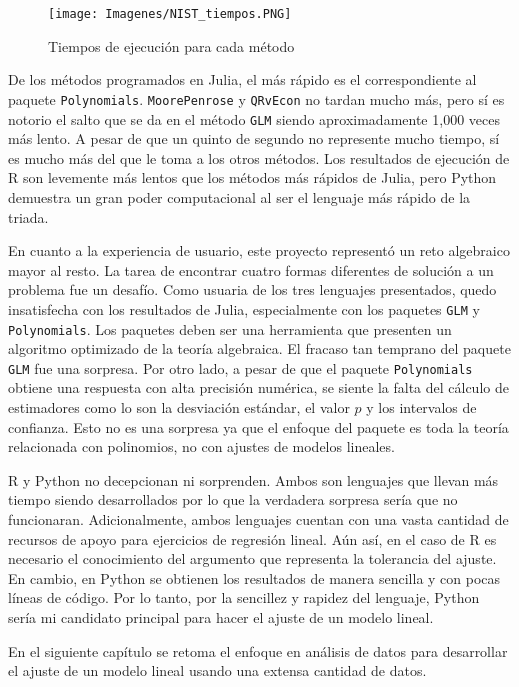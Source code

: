 \begin{figure}[h]
\begin{center}
\texttt{[image: Imagenes/NIST\_tiempos.PNG]}
\caption{Tiempos de ejecución para cada método}
\label{NIST_tiempos}
\end{center}
\end{figure}

De los métodos programados en \textsf{Julia}, el más rápido es el correspondiente al paquete \texttt{Polynomials}. \texttt{MoorePenrose} y \texttt{QRvEcon} no tardan mucho más, pero sí es notorio el salto que se da en el método \texttt{GLM} siendo aproximadamente 1,000 veces más lento. A pesar de que un quinto de segundo no represente mucho tiempo, sí es mucho más del que le toma a los otros métodos. Los resultados de ejecución de \textsf{R} son levemente más lentos que los métodos más rápidos de \textsf{Julia}, pero \textsf{Python} demuestra un gran poder computacional al ser el lenguaje más rápido de la triada. 

En cuanto a la experiencia de usuario, este proyecto representó un reto algebraico mayor al resto. La tarea de encontrar cuatro formas diferentes de solución a un problema fue un desafío. Como usuaria de los tres lenguajes presentados, quedo insatisfecha con los resultados de \textsf{Julia}, especialmente con los paquetes \texttt{GLM} y \texttt{Polynomials}. Los paquetes deben ser una herramienta que presenten un algoritmo optimizado de la teoría algebraica. El fracaso tan temprano del paquete \texttt{GLM} fue una sorpresa. Por otro lado, a pesar de que el paquete \texttt{Polynomials} obtiene una respuesta con alta precisión numérica, se siente la falta del cálculo de estimadores como lo son la desviación estándar, el valor $p$ y los intervalos de confianza. Esto no es una sorpresa ya que el enfoque del paquete es toda la teoría relacionada con polinomios, no con ajustes de modelos lineales. 

\textsf{R} y \textsf{Python} no decepcionan ni sorprenden. Ambos son lenguajes que llevan más tiempo siendo desarrollados por lo que la verdadera sorpresa sería que no funcionaran. Adicionalmente, ambos lenguajes cuentan con una vasta cantidad de recursos de apoyo para ejercicios de regresión lineal. Aún así, en el caso de \textsf{R} es necesario el conocimiento del argumento que representa la tolerancia del ajuste. En cambio, en \textsf{Python} se obtienen los resultados de manera sencilla y con pocas líneas de código. Por lo tanto, por la sencillez y rapidez del lenguaje, \textsf{Python} sería mi candidato principal para hacer el ajuste de un modelo lineal. 

En el siguiente capítulo se retoma el enfoque en análisis de datos para desarrollar el ajuste de un modelo lineal usando una extensa cantidad de datos. 

